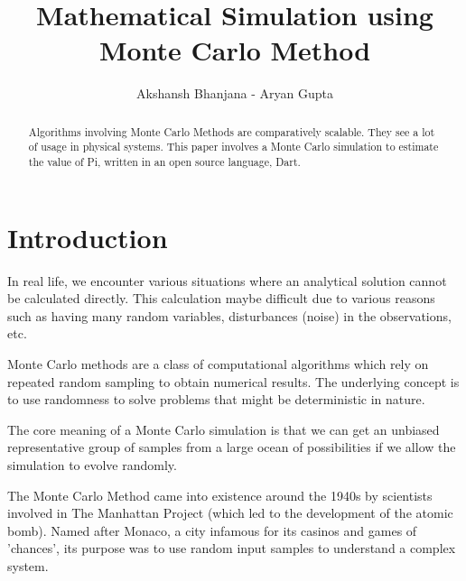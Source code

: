 \documentclass{resonance}
\begin{document}
	
	\title{Mathematical Simulation using Monte Carlo Method}
	\author{Akshansh Bhanjana - Aryan Gupta}
	
	\maketitle
	
	\begin{abstract}
		Algorithms involving Monte Carlo Methods are comparatively scalable. They see a lot of usage in physical systems. This paper involves a Monte Carlo simulation to estimate the value of Pi, written in an open source language, Dart.
	\end{abstract}
	
	
	
	\section{Introduction}
	In real life, we encounter various situations where an analytical solution cannot be calculated directly. This calculation maybe difficult due to various reasons such as having many random variables, disturbances (noise) in the observations, etc.
	
	Monte Carlo methods are a class of computational algorithms which rely on repeated random sampling to obtain numerical results. The underlying concept is to use randomness to solve problems that might be deterministic in nature.
	
	The core meaning of a Monte Carlo simulation is that we can get an unbiased representative group of samples from a large ocean of possibilities if we allow the simulation to evolve randomly.
	
	The Monte Carlo Method came into existence around the 1940s by scientists involved in The Manhattan Project (which led to the development of the atomic bomb). Named after Monaco, a city infamous for its casinos and games of 'chances', its purpose was to use random input samples to understand a complex system. 
	
\end{document}
